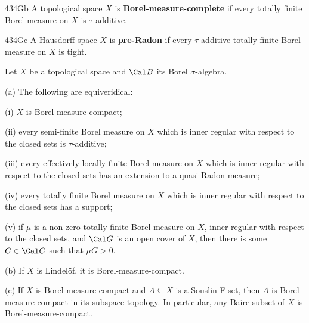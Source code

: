 \spheader 434Gb A topological space $X$ is 
{\bf Borel-measure-complete} if 
every totally finite Borel measure on
$X$ is $\tau$-additive.   

\spheader 434Gc A Hausdorff space $X$ is {\bf pre-Radon} if every $\tau$-additive
totally finite Borel measure on $X$ is tight.   

 Let $X$ be a topological space and $\Cal B$
its Borel $\sigma$-algebra.

(a) The following are equiveridical:

\quad(i) $X$ is Borel-measure-compact;

\quad(ii) every semi-finite Borel measure on $X$ which is inner regular
with respect to the closed sets is $\tau$-additive;

\quad(iii) every effectively locally
finite Borel measure on $X$ which is inner regular with respect to the
closed sets has an extension to a quasi-Radon measure;

\quad(iv) every totally finite Borel measure on $X$ which is inner
regular with respect to the closed sets has a support;

\quad(v) if
$\mu$ is a non-zero totally finite Borel measure on $X$, inner regular
with respect to the closed sets, and $\Cal G$ is an open cover of $X$,
then there is some $G\in\Cal G$ such that $\mu G>0$.

(b) If $X$ is Lindel\"of, it is Borel-measure-compact.

(c) If $X$ is Borel-measure-compact and $A\subseteq X$ is a Souslin-F
set, then $A$ is Borel-measure-compact in its subspace topology.
In particular, any Baire subset of $X$ is Borel-measure-compact.

